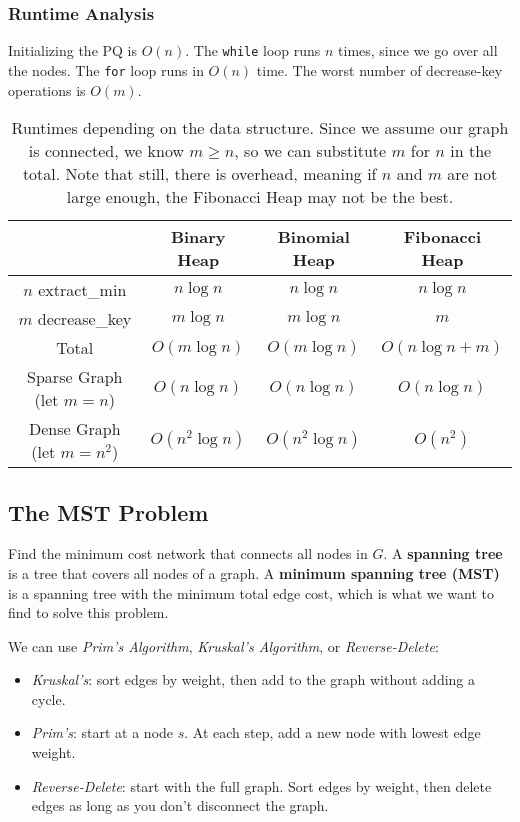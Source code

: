 \documentclass[11pt]{article}
\begin{document}
\subsubsection{Runtime Analysis}
Initializing the PQ is $O(n)$. The \texttt{while} loop runs $n$ times, since we go over all the nodes. The \texttt{for} loop runs in $O(n)$ time. The worst number of decrease-key operations is $O(m)$. 
\begin{table}[H]
    \centering
    \begin{tabular}{c|c|c|c}
    \toprule
        & Binary Heap & Binomial Heap & Fibonacci Heap \\ \midrule
         $n$ extract\_min & $n \log n$ & $n \log n$ & $n \log n$ \\
         $m$ decrease\_key & $m \log n$ & $m \log n$ & $m$ \\ \midrule
         Total & $O(m \log n)$ & $O(m \log n)$ & $O(n \log n + m)$ \\
    \midrule
    Sparse Graph (let $m = n$) & $O(n \log n)$ & $O(n \log n)$ & $O(n \log n)$ \\
    Dense Graph (let $m = n^2$) & $O(n^2 \log n)$ & $O(n^2 \log n)$ & $O(n^2)$ \\
    \bottomrule
    \end{tabular}
    \caption{Runtimes depending on the data structure. Since we assume our graph is connected, we know $m \geq n$, so we can substitute $m$ for $n$ in the total. Note that still, there is overhead, meaning if $n$ and $m$ are not large enough, the Fibonacci Heap may not be the best.}
    \label{tab:my_label}
\end{table}
\subsection{The MST Problem}
Find the minimum cost network that connects all nodes in $G$. A \textbf{spanning tree} is a tree that covers all nodes of a graph. A \textbf{minimum spanning tree (MST)} is a spanning tree with the minimum total edge cost, which is what we want to find to solve this problem.

We can use \textit{Prim's Algorithm}, \textit{Kruskal's Algorithm}, or \textit{Reverse-Delete}:
\begin{itemize}
    \item \textit{Kruskal's}: sort edges by weight, then add to the graph without adding a cycle.
    \item \textit{Prim's}: start at a node $s$. At each step, add a new node with lowest edge weight.
    \item \textit{Reverse-Delete}: start with the full graph. Sort edges by weight, then delete edges as long as you don't disconnect the graph.
\end{itemize}
\end{document}

